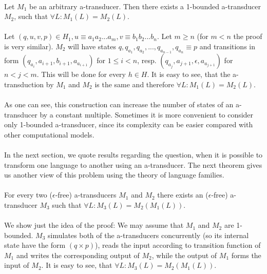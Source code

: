 \paragraph{}
\clema Let $M_{1}$ be an arbitrary a-transducer. Then there exists a 1-bounded a-transducer $M_{2}$, such that $\forall L: M_{1}(L) = M_{2}(L)$.

\paragraph{}
\dokaz Let $(q, u, v, p) \in H_{1}, u \equiv a_{1}a_{2}...a_{m}, v \equiv b_{1}b_{2}...b_{n}$. Let $m\geq n$ (for $m < n$ the proof is very similar). $M_{2}$ will have states $q, q_{a_{1}}, q_{a_{2}}, ..., q_{a_{n-1}}, q_{a_{n}} \equiv p$ and transitions in form $(q_{a_{i}}, a_{i+1}, b_{i+1}, a_{a_{i+1}})$ for $1 \leq i<n$, resp. $(q_{a_{j}}, a_{j+1}, \epsilon, a_{a_{j+1}})$ for $n < j < m$. This will be done for every $h \in H$. It is easy to see, that the a-transduction by $M_{1}$ and $M_{2}$ is the same and therefore $\forall L: M_{1}(L) = M_{2}(L)$. \square

\paragraph{}
As one can see, this construction can increase the number of states of an a-transducer by a constant multiple. Sometimes it is more convenient to consider only 1-bounded a-transducer, since its complexity can be easier compared with other computational models.

\paragraph{}
In the next section, we quote results regarding the question, when it is possible to transform one language to another using an a-transducer. The next theorem gives us another view of this problem using the theory of language families.

\paragraph{}
\clema For every two ($\epsilon $-free) a-transducers $M_{1}$ and $M_{2}$ there exists an ($\epsilon $-free) a-transducer $M_{3}$ such that $\forall L: M_{3}(L) = M_{2}(M_{1}(L))$.

\paragraph{}
\dokaz We show just the idea of the proof: We may assume that $M_{1}$ and $M_{2}$ are 1-bounded. $M_{3}$ simulates both of the a-transducers concurrently (so its internal state have the form $(q \times p)$), reads the input according to transition function of $M_{1}$ and writes the corresponding output of $M_{2}$, while the output of $M_{1}$ forms the input of $M_{2}$. It is easy to see, that $\forall L: M_{3}(L) = M_{2}(M_{1}(L))$. \square


